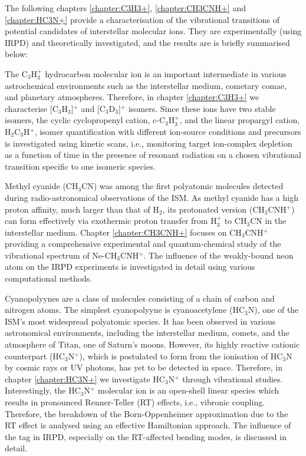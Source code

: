 The following chapters \ref{chapter:C3H3+}, \ref{chapter:CH3CNH+} and \ref{chapter:HC3N+} provide a characterisation of the vibrational transitions of potential candidates of interstellar molecular ions. They are experimentally (using IRPD) and theoretically investigated, and the results are is briefly summarised below:

The C$_3$H$_3^+$ hydrocarbon molecular ion is an important intermediate in various astrochemical environments such as the interstellar medium, cometary comae, and planetary atmospheres. Therefore, in chapter \ref{chapter:C3H3+} we characterise [C$_3$H$_3$]$^+$ and [C$_3$D$_3$]$^+$ isomers. Since these ions have two stable isomers, the cyclic cyclopropenyl cation, c-C$_3$H$_3^+$, and the linear propargyl cation, H$_2$C$_3$H$^+$, isomer quantification with different ion-source conditions and precursors is investigated using kinetic scans, i.e., monitoring target ion-complex depletion as a function of time in the presence of resonant radiation on a chosen vibrational transition specific to one isomeric species.

Methyl cyanide (CH$_3$CN) was among the first polyatomic molecules detected during radio-astronomical observations of the ISM. As methyl cyanide has a high proton affinity, much larger than that of H$_2$, its protonated version (CH$_3$CNH$^+$) can form effectively via exothermic proton transfer from H$_3^+$ to CH$_3$CN in the interstellar medium. Chapter \ref{chapter:CH3CNH+} focuses on CH$_3$CNH$^+$ providing a comprehensive experimental and quantum-chemical study of the vibrational spectrum of Ne-CH$_3$CNH$^+$. The influence of the weakly-bound neon atom on the IRPD experiments is investigated in detail using various computational methods.

Cyanopolyynes are a class of molecules consisting of a chain of carbon and nitrogen atoms. The simplest cyanopolyyne is cyanoacetylene (HC$_3$N), one of the ISM's most widespread polyatomic species. It has been observed in various astronomical environments, including the interstellar medium, comets, and the atmosphere of Titan, one of Saturn's moons. However, its highly reactive cationic counterpart (HC$_3$N$^+$), which is postulated to form from the ionisation of HC$_3$N by cosmic rays or UV photons, has yet to be detected in space. Therefore, in chapter \ref{chapter:HC3N+} we investigate HC$_3$N$^+$ through vibrational studies. Interestingly, the HC$_3$N$^+$ molecular ion is an open-shell linear species which results in pronounced Renner-Teller (RT) effects, i.e., vibronic coupling. Therefore, the breakdown of the Born-Oppenheimer approximation due to the RT effect is analysed using an effective Hamiltonian approach. The influence of the tag in IRPD, especially on the RT-affected bending modes, is discussed in detail.

